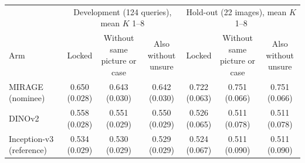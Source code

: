 \begin{tabular}{@{}lcccccc@{}}
\toprule
 & \multicolumn{3}{c}{Development (124 queries), mean $K$ 1--8} & \multicolumn{3}{c}{Hold-out (22 images), mean $K$ 1--8} \\
\cmidrule(lr){2-4}\cmidrule(l){5-7}
Arm & Locked & \makecell{Without same\\picture or case} & \makecell{Also without\\unsure} & Locked & \makecell{Without same\\picture or case} & \makecell{Also without\\unsure} \\
\midrule
MIRAGE (nominee) & \makecell{0.650\\{\scriptsize (0.028)}} & \makecell{0.643\\{\scriptsize (0.030)}} & \makecell{0.642\\{\scriptsize (0.030)}} & \makecell{0.722\\{\scriptsize (0.063)}} & \makecell{0.751\\{\scriptsize (0.066)}} & \makecell{0.751\\{\scriptsize (0.066)}} \\
DINOv2 & \makecell{0.558\\{\scriptsize (0.028)}} & \makecell{0.551\\{\scriptsize (0.029)}} & \makecell{0.550\\{\scriptsize (0.029)}} & \makecell{0.526\\{\scriptsize (0.065)}} & \makecell{0.511\\{\scriptsize (0.078)}} & \makecell{0.511\\{\scriptsize (0.078)}} \\
Inception-v3 (reference) & \makecell{0.534\\{\scriptsize (0.029)}} & \makecell{0.530\\{\scriptsize (0.029)}} & \makecell{0.529\\{\scriptsize (0.029)}} & \makecell{0.524\\{\scriptsize (0.067)}} & \makecell{0.511\\{\scriptsize (0.090)}} & \makecell{0.511\\{\scriptsize (0.090)}} \\

\end{tabular}
